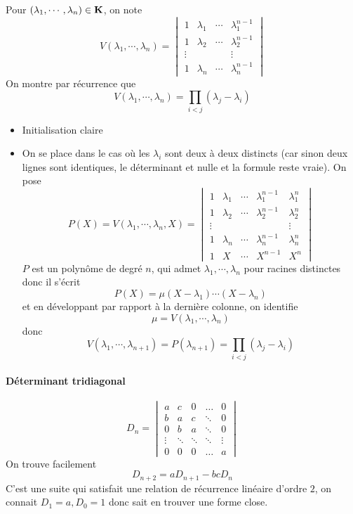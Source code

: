 Pour $(\lambda_1, \cdots , \lambda_n) \in  \mathbf K$, on note \[
    V(\lambda_1, \cdots , \lambda_n)= \begin{vmatrix}
        1 & \lambda_1 & \cdots & \lambda_1^{n-1} \\
        1 & \lambda_2 & \cdots & \lambda_2^{n-1} \\
        \vdots & & & \vdots \\
        1 & \lambda_n & \cdots & \lambda_n^{n-1}
    \end{vmatrix}
\] 
On montre par récurrence que \[
    V(\lambda_1, \cdots , \lambda_n)=\prod_{i<j}(\lambda_j-\lambda_i)
\] 
\begin{itemize}
    \item Initialisation claire
    \item On se place dans le cas où les $\lambda_i$ sont deux à deux distincts (car sinon deux lignes sont identiques, le déterminant et nulle et la formule reste vraie). On pose\[
            P(X)=V(\lambda_1, \cdots , \lambda_n, X)= \begin{vmatrix}
                1 & \lambda_1 & \cdots & \lambda_1^{n-1} & \lambda_1^n\\
        1 & \lambda_2 & \cdots & \lambda_2^{n-1}  & \lambda_2^n\\
        \vdots & & & &\vdots \\
        1 & \lambda_n & \cdots & \lambda_n^{n-1} & \lambda_n^n \\
        1 & X & \cdots & X^{n-1} & X^n
    \end{vmatrix}
    \] 
    $P$ est un polynôme de degré  $n$, qui admet  $\lambda_1, \cdots , \lambda_n$ pour racines distinctes donc il s'écrit \[
        P(X)=\mu(X-\lambda_1)\cdots (X-\lambda_n)
    \] 
    et en développant par rapport à la dernière colonne, on identifie \[
        \mu=V(\lambda_1, \cdots , \lambda_n)
    \] 
    donc \[
        V(\lambda_1, \cdots , \lambda_{n+1})=P(\lambda_{n+1})=\prod_{i<j}(\lambda_j-\lambda_i)
    \] 
\end{itemize}

\paragraph{Déterminant tridiagonal}

\[
D_n = \begin{vmatrix}
a & c & 0 & \dots & 0\\
b & a & c & \ddots & 0\\
0 & b & a & \ddots & 0\\
\vdots & \ddots & \ddots &\ddots &\vdots \\
0 & 0 & 0 & \dots & a 
\end{vmatrix}
\] 
On trouve facilement \[
D_{n+2}=aD_{n+1}-bcD_n
\] 
C'est une suite qui satisfait une relation de récurrence linéaire d'ordre $2$, on connait  $D_1=a, D_0=1$ donc sait en trouver une forme close.

